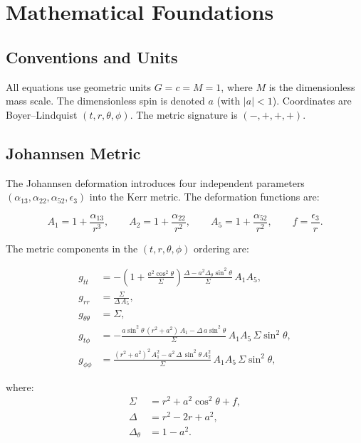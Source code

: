 \documentclass[11pt,twoside]{article}
\begin{document}
\section{Mathematical Foundations}
\label{sec:physics}

\subsection{Conventions and Units}
All equations use geometric units $G = c = M = 1$, where $M$ is the
dimensionless mass scale. The dimensionless spin is denoted $a$ (with $|a| < 1$).
Coordinates are Boyer--Lindquist $(t, r, \theta, \phi)$. The metric signature is
$(-, +, +, +)$.

\subsection{Johannsen Metric}
\label{sec:johannsen-metric}

The Johannsen deformation introduces four independent parameters
$(\alpha_{13}, \alpha_{22}, \alpha_{52}, \epsilon_3)$ into the Kerr metric.
The deformation functions are:

\begin{equation}
A_1 = 1 + \frac{\alpha_{13}}{r^3}, \qquad
A_2 = 1 + \frac{\alpha_{22}}{r^2}, \qquad
A_5 = 1 + \frac{\alpha_{52}}{r^2}, \qquad
f = \frac{\epsilon_3}{r}.
\end{equation}

The metric components in the $(t, r, \theta, \phi)$ ordering are:

\begin{align}
g_{tt} &= -\left(1 + \frac{a^2 \cos^2\theta}{\Sigma}\right)\frac{\Delta - a^2 \Delta_\theta \sin^2\theta}{\Sigma}\, A_1 A_5, \\
g_{rr} &= \frac{\Sigma}{\Delta\, A_5}, \\
g_{\theta\theta} &= \Sigma, \\
g_{t\phi} &= -\frac{a \sin^2\theta\,(r^2 + a^2)\,A_1 - \Delta\,a\sin^2\theta}{\Sigma}\,A_1 A_5\,\Sigma\sin^2\theta, \\
g_{\phi\phi} &= \frac{(r^2+a^2)^2\,A_1^2 - a^2\,\Delta\,\sin^2\theta\,A_2^2}{\Sigma}\,A_1 A_5\,\Sigma\sin^2\theta,
\end{align}

where:
\begin{align}
\Sigma &= r^2 + a^2 \cos^2\theta + f, \\
\Delta &= r^2 - 2r + a^2, \\
\Delta_\theta &= 1 - a^2.
\end{align}
\end{document}
